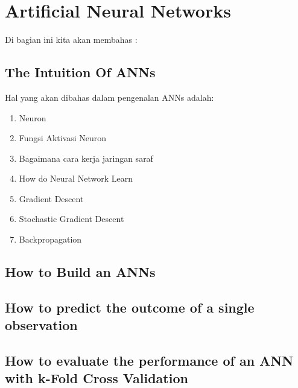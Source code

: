 \section{Artificial Neural Networks}
Di bagian ini kita akan membahas :

\subsection{The Intuition Of ANNs}
Hal yang akan dibahas dalam pengenalan ANNs adalah:
\begin{enumerate}
  \item Neuron
  \item Fungsi Aktivasi Neuron 
  \item Bagaimana cara kerja jaringan saraf
  \item How do Neural Network Learn
  \item Gradient Descent
  \item Stochastic Gradient Descent
  \item Backpropagation
\end{enumerate}

\subsection{How to Build an ANNs}
\subsection{How to predict the outcome of a single observation}
\subsection{How to evaluate the performance of an ANN with k-Fold Cross Validation}
